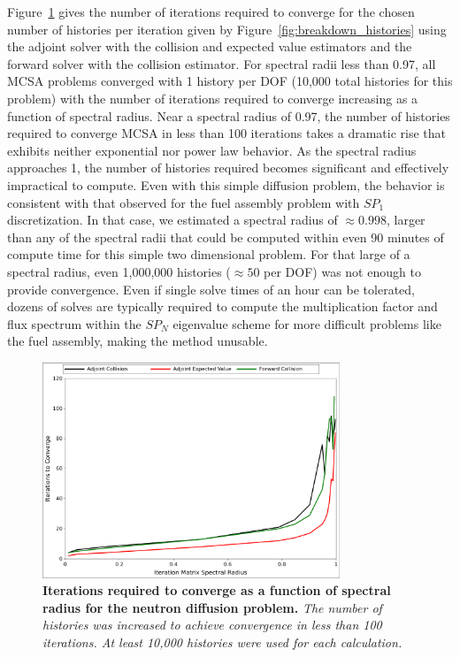 \documentclass[letterpaper,11pt]{article}
\begin{document}
Figure~\ref{fig:breakdown_iterations} gives the number of iterations
required to converge for the chosen number of histories per iteration
given by Figure~\ref{fig:breakdown_histories} using the adjoint solver
with the collision and expected value estimators and the forward
solver with the collision estimator. For spectral radii less than
0.97, all MCSA problems converged with 1 history per DOF (10,000 total
histories for this problem) with the number of iterations required to
converge increasing as a function of spectral radius. Near a spectral
radius of 0.97, the number of histories required to converge MCSA in
less than 100 iterations takes a dramatic rise that exhibits neither
exponential nor power law behavior. As the spectral radius approaches
1, the number of histories required becomes significant and
effectively impractical to compute. Even with this simple diffusion
problem, the behavior is consistent with that observed for the fuel
assembly problem with $SP_1$ discretization. In that case, we
estimated a spectral radius of $\approx 0.998$, larger than any of the
spectral radii that could be computed within even 90 minutes of
compute time for this simple two dimensional problem. For that large
of a spectral radius, even 1,000,000 histories ($\approx 50$ per DOF)
was not enough to provide convergence. Even if single solve times of
an hour can be tolerated, dozens of solves are typically required to
compute the multiplication factor and flux spectrum within the $SP_N$
eigenvalue scheme for more difficult problems like the fuel assembly,
making the method unusable.
\begin{figure}[t!]
  \begin{center}
    \includegraphics[width=3.5in]{breakdown_iterations.pdf}
  \end{center}
  \caption{\textbf{Iterations required to converge as a function of
      spectral radius for the neutron diffusion problem.} \textit{The
      number of histories was increased to achieve convergence in less
      than 100 iterations. At least 10,000 histories were used for
      each calculation.}}
  \label{fig:breakdown_iterations}
\end{figure}
\end{document}
